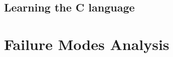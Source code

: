 \documentclass{article}
\begin{document}
\subsection{Learning the C language}



\section{Failure Modes Analysis}
\end{document}
